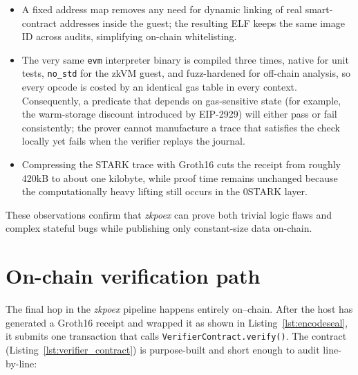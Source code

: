 \begin{itemize}
  \item A fixed address map removes any need for dynamic linking of real smart-contract addresses inside the guest; the resulting ELF keeps the same image ID across audits, simplifying on-chain whitelisting.
  \item The very same \texttt{evm} interpreter binary is compiled three times, native for unit tests, \texttt{no\_std} for the zkVM guest, and fuzz-hardened for off-chain analysis, so every opcode is costed by an identical gas table in every context.  Consequently, a predicate that depends on gas-sensitive state (for example, the warm-storage discount introduced by EIP-2929) will either pass or fail consistently; the prover cannot manufacture a trace that satisfies the check locally yet fails when the verifier replays the journal.
  \item Compressing the STARK trace with Groth16 cuts the receipt from roughly 420kB to about one kilobyte, while proof time remains unchanged because the computationally heavy lifting still occurs in the 0STARK layer.
\end{itemize}

These observations confirm that \textit{zkpoex} can prove both trivial logic flaws and complex stateful bugs while publishing only constant-size data on-chain.

\section{On-chain verification path}\label{sec:onchain}

The final hop in the \textit{zkpoex} pipeline happens entirely on–chain. After the host has generated a Groth16 receipt and wrapped it as shown in Listing~\ref{lst:encodeseal}, it submits one transaction that calls \texttt{VerifierContract.verify()}. The contract (Listing~\ref{lst:verifier_contract}) is purpose-built and short enough to audit line-by-line:

